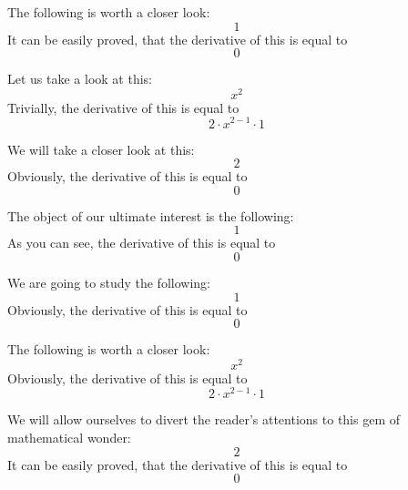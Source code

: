 \documentclass{article}
\begin{document}
The following is worth a closer look:
\begin{equation}
1 
\end{equation}
It can be easily proved, that the derivative of this is equal to
\begin{equation}
0 
\end{equation}

Let us take a look at this:
\begin{equation}
x ^{2 } 
\end{equation}
Trivially, the derivative of this is equal to
\begin{equation}
2 \cdot x ^{2 - 1 } \cdot 1 
\end{equation}

We will take a closer look at this:
\begin{equation}
2 
\end{equation}
Obviously, the derivative of this is equal to
\begin{equation}
0 
\end{equation}

The object of our ultimate interest is the following:
\begin{equation}
1 
\end{equation}
As you can see, the derivative of this is equal to
\begin{equation}
0 
\end{equation}

We are going to study the following:
\begin{equation}
1 
\end{equation}
Obviously, the derivative of this is equal to
\begin{equation}
0 
\end{equation}

The following is worth a closer look:
\begin{equation}
x ^{2 } 
\end{equation}
Obviously, the derivative of this is equal to
\begin{equation}
2 \cdot x ^{2 - 1 } \cdot 1 
\end{equation}

We will allow ourselves to divert the reader's attentions to this gem of mathematical wonder:
\begin{equation}
2 
\end{equation}
It can be easily proved, that the derivative of this is equal to
\begin{equation}
0 
\end{equation}
\end{document}

